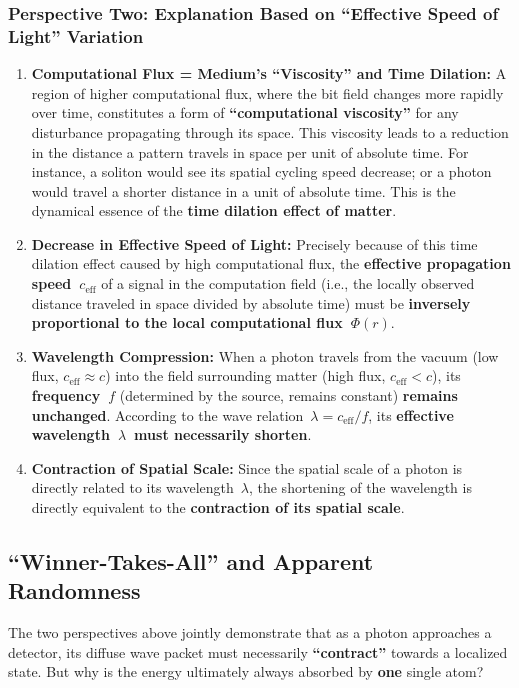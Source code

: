 \documentclass[11pt, a4paper]{article}
\begin{document}
\subsubsection{Perspective Two: Explanation Based on ``Effective Speed of Light'' Variation}
\begin{enumerate}
    \item \textbf{Computational Flux = Medium's ``Viscosity'' and Time Dilation:} A region of higher computational flux, where the bit field changes more rapidly over time, constitutes a form of \textbf{``computational viscosity''} for any disturbance propagating through its space. This viscosity leads to a reduction in the distance a pattern travels in space per unit of absolute time. For instance, a soliton would see its spatial cycling speed decrease; or a photon would travel a shorter distance in a unit of absolute time. This is the dynamical essence of the \textbf{time dilation effect of matter}.
    \item \textbf{Decrease in Effective Speed of Light:} Precisely because of this time dilation effect caused by high computational flux, the \textbf{effective propagation speed~$c_{\text{eff}}$} of a signal in the computation field (i.e., the locally observed distance traveled in space divided by absolute time) must be \textbf{inversely proportional to the local computational flux~$\Phi(r)$}.
    \item \textbf{Wavelength Compression:} When a photon travels from the vacuum (low flux, $c_{\text{eff}} \approx c$) into the field surrounding matter (high flux, $c_{\text{eff}} < c$), its \textbf{frequency~$f$} (determined by the source, remains constant) \textbf{remains unchanged}. According to the wave relation~$\lambda = c_{\text{eff}} / f$, its \textbf{effective wavelength~$\lambda$~must necessarily shorten}.
    \item \textbf{Contraction of Spatial Scale:} Since the spatial scale of a photon is directly related to its wavelength~$\lambda$, the shortening of the wavelength is directly equivalent to the \textbf{contraction of its spatial scale}.
\end{enumerate}

\subsection{``Winner-Takes-All'' and Apparent Randomness}

The two perspectives above jointly demonstrate that as a photon approaches a detector, its diffuse wave packet must necessarily \textbf{``contract''} towards a localized state. But why is the energy ultimately always absorbed by \textbf{one} single atom?
\end{document}
